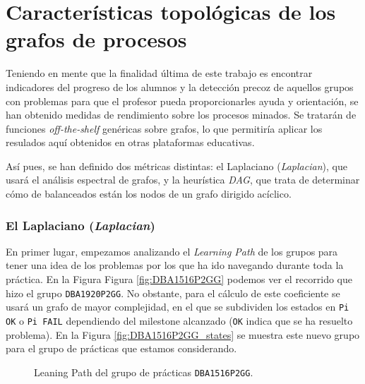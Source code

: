 \chapter{Características topológicas de los grafos de procesos}

Teniendo en mente que la finalidad última de este trabajo es encontrar indicadores del progreso de los alumnos y la detección precoz de aquellos grupos con problemas para que el profesor pueda proporcionarles ayuda y orientación, se han obtenido medidas de rendimiento sobre los procesos minados. Se tratarán de funciones \emph{off-the-shelf} genéricas sobre grafos, lo que permitiría aplicar los resulados aquí obtenidos en otras plataformas educativas.

Así pues, se han definido dos métricas distintas: el Laplaciano (\emph{Laplacian}), que usará el análisis espectral de grafos, y la heurística \emph{DAG}, que trata de determinar cómo de balanceados están los nodos de un grafo dirigido acíclico.

\subsection{El Laplaciano (\emph{Laplacian})}

En primer lugar, empezamos analizando el \emph{Learning Path} de los grupos para tener una idea de los problemas por los que ha ido navegando durante toda la práctica. En la Figura Figura \ref{fig:DBA1516P2GG} podemos ver el recorrido que hizo el grupo \texttt{DBA1920P2GG}. No obstante, para el cálculo de este coeficiente se usará un grafo de mayor complejidad, en el que se subdividen los estados en \texttt{Pi OK} o \texttt{Pi FAIL} dependiendo del milestone alcanzado (\texttt{OK} indica que se ha resuelto problema). En la Figura \ref{fig:DBA1516P2GG_states} se muestra este nuevo grupo para el grupo de prácticas que estamos considerando.

\begin{figure}[H]
\centering
{}\qquad
{}
\caption{Leaning Path del grupo de prácticas \texttt{DBA1516P2GG}.}
\label{fig:laplacian}
\end{figure}

